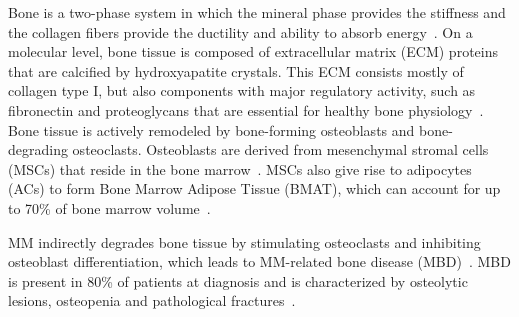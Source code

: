\label{sec:intro_myeloma_bone}
Bone is a two-phase system in which the mineral phase provides the stiffness and
the collagen fibers provide the ductility and ability to absorb
energy~\cite{viguet-carrinRoleCollagenBone2006}. On a molecular level, bone
tissue is composed of extracellular matrix (ECM) proteins that are calcified by
hydroxyapatite crystals. This ECM consists mostly of collagen type I, but also
components with major regulatory activity, such as fibronectin and proteoglycans
that are essential for healthy bone
physiology~\cite{alcorta-sevillanoDecipheringRelevanceBone2020}. Bone tissue is
actively remodeled by bone-forming osteoblasts and bone-degrading osteoclasts.
Osteoblasts are derived from mesenchymal stromal cells (MSCs) that reside in the
bone marrow~\cite{friedensteinOsteogenesisTransplantsBone1966,
    pittengerMultilineagePotentialAdult1999}. MSCs also give rise to adipocytes
(ACs) to form Bone Marrow Adipose Tissue (BMAT), which can account for up to
70\% of bone marrow volume~\cite{fazeliMarrowFatBone2013}.

MM indirectly degrades bone tissue by stimulating osteoclasts and inhibiting
osteoblast differentiation, which leads to MM-related bone disease
(MBD)~\cite{glaveyProteomicCharacterizationHuman2017}. MBD is present in 80\% of
patients at diagnosis and is characterized by osteolytic lesions, osteopenia and
pathological fractures~\cite{terposPathogenesisBoneDisease2018}.





